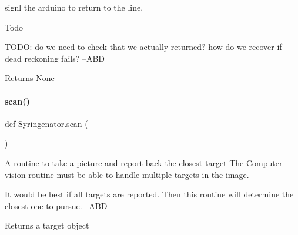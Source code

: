 signl the arduino to return to the line. 

\begin{DoxyRefDesc}{Todo}
\item[\mbox{\hyperlink{todo__todo000002}{Todo}}]T\+O\+DO\+: do we need to check that we actually returned? how do we recover if dead reckoning fails? --A\+BD \end{DoxyRefDesc}
\begin{DoxyReturn}{Returns}
None 
\end{DoxyReturn}
\mbox{\label{namespaceSyringenator_aff01237d3ff3e33f0ffc32927d813df0}} 
\paragraph{\texorpdfstring{scan()}{scan()}}
{\footnotesize\ttfamily def Syringenator.\+scan (\begin{DoxyParamCaption}{ }\end{DoxyParamCaption})}



A routine to take a picture and report back the closest target The Computer vision routine must be able to handle multiple targets in the image. 

It would be best if all targets are reported. Then this routine will determine the closest one to pursue. --A\+BD

\begin{DoxyReturn}{Returns}
a target object 
\end{DoxyReturn}
